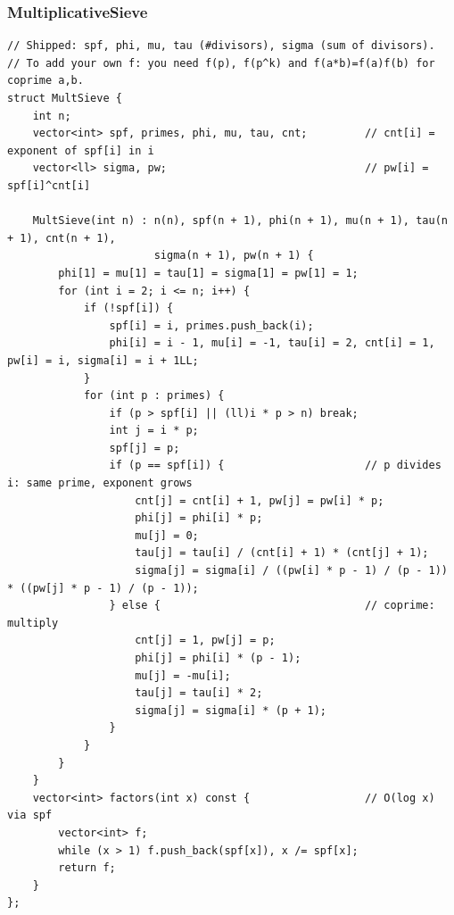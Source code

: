 \documentclass[9pt,a4paper,twocolumn]{extarticle}
\begin{document}
\filbreak
\subsubsection{MultiplicativeSieve}
\nopagebreak
\begin{lstlisting}
// Shipped: spf, phi, mu, tau (#divisors), sigma (sum of divisors).
// To add your own f: you need f(p), f(p^k) and f(a*b)=f(a)f(b) for coprime a,b.
struct MultSieve {
    int n;
    vector<int> spf, primes, phi, mu, tau, cnt;         // cnt[i] = exponent of spf[i] in i
    vector<ll> sigma, pw;                               // pw[i] = spf[i]^cnt[i]

    MultSieve(int n) : n(n), spf(n + 1), phi(n + 1), mu(n + 1), tau(n + 1), cnt(n + 1),
                       sigma(n + 1), pw(n + 1) {
        phi[1] = mu[1] = tau[1] = sigma[1] = pw[1] = 1;
        for (int i = 2; i <= n; i++) {
            if (!spf[i]) {
                spf[i] = i, primes.push_back(i);
                phi[i] = i - 1, mu[i] = -1, tau[i] = 2, cnt[i] = 1, pw[i] = i, sigma[i] = i + 1LL;
            }
            for (int p : primes) {
                if (p > spf[i] || (ll)i * p > n) break;
                int j = i * p;
                spf[j] = p;
                if (p == spf[i]) {                      // p divides i: same prime, exponent grows
                    cnt[j] = cnt[i] + 1, pw[j] = pw[i] * p;
                    phi[j] = phi[i] * p;
                    mu[j] = 0;
                    tau[j] = tau[i] / (cnt[i] + 1) * (cnt[j] + 1);
                    sigma[j] = sigma[i] / ((pw[i] * p - 1) / (p - 1)) * ((pw[j] * p - 1) / (p - 1));
                } else {                                // coprime: multiply
                    cnt[j] = 1, pw[j] = p;
                    phi[j] = phi[i] * (p - 1);
                    mu[j] = -mu[i];
                    tau[j] = tau[i] * 2;
                    sigma[j] = sigma[i] * (p + 1);
                }
            }
        }
    }
    vector<int> factors(int x) const {                  // O(log x) via spf
        vector<int> f;
        while (x > 1) f.push_back(spf[x]), x /= spf[x];
        return f;
    }
};
\end{lstlisting}

\filbreak
\end{document}

